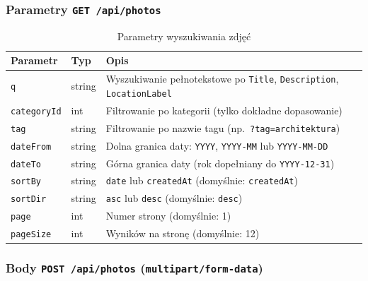 \documentclass[12pt, a4paper]{article}
\begin{document}
\subsubsection{Parametry \texttt{GET /api/photos}}

\begin{table}[H]
  \centering
  \caption{Parametry wyszukiwania zdjęć}
  \begin{tabular}{@{}L{3cm}L{2cm}L{9cm}@{}}
    \toprule
    \textbf{Parametr} & \textbf{Typ} & \textbf{Opis} \\
    \midrule
    \texttt{q}          & string & Wyszukiwanie pełnotekstowe po \texttt{Title}, \texttt{Description}, \texttt{LocationLabel} \\
    \texttt{categoryId} & int    & Filtrowanie po kategorii (tylko dokładne dopasowanie) \\
    \texttt{tag}        & string & Filtrowanie po nazwie tagu (np.\ \texttt{?tag=architektura}) \\
    \texttt{dateFrom}   & string & Dolna granica daty: \texttt{YYYY}, \texttt{YYYY-MM} lub \texttt{YYYY-MM-DD} \\
    \texttt{dateTo}     & string & Górna granica daty (rok dopełniany do \texttt{YYYY-12-31}) \\
    \texttt{sortBy}     & string & \texttt{date} lub \texttt{createdAt} (domyślnie: \texttt{createdAt}) \\
    \texttt{sortDir}    & string & \texttt{asc} lub \texttt{desc} (domyślnie: \texttt{desc}) \\
    \texttt{page}       & int    & Numer strony (domyślnie: 1) \\
    \texttt{pageSize}   & int    & Wyników na stronę (domyślnie: 12) \\
    \bottomrule
  \end{tabular}
\end{table}

\subsubsection{Body \texttt{POST /api/photos} (\texttt{multipart/form-data})}
\end{document}
